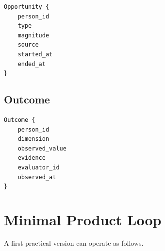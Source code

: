 \documentclass[11pt]{article}
\begin{document}
\begin{verbatim}
Opportunity {
    person_id
    type
    magnitude
    source
    started_at
    ended_at
}
\end{verbatim}

\subsection*{Outcome}

\begin{verbatim}
Outcome {
    person_id
    dimension
    observed_value
    evidence
    evaluator_id
    observed_at
}
\end{verbatim}

\section{Minimal Product Loop}

A first practical version can operate as follows.
\end{document}
